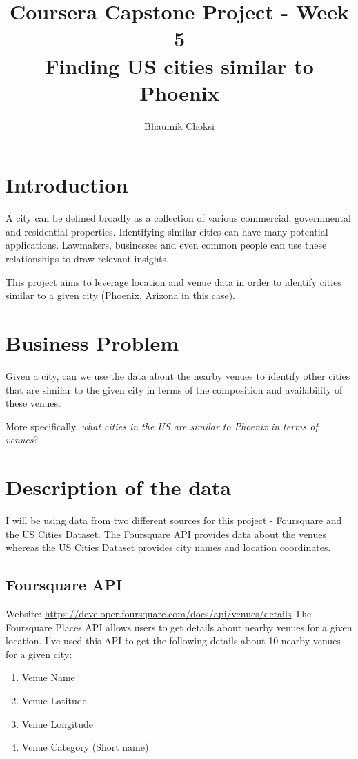 \documentclass[12pt, a4paper]{report}
\title{Coursera Capstone Project - Week 5\\ \textbf{Finding US cities similar to Phoenix} }
\author{Bhaumik Choksi}
\begin{document}
	\maketitle
		
	\section*{Introduction}
	A city can be defined broadly as a collection of various commercial, governmental and residential properties. Identifying similar cities can have many potential applications. Lawmakers, businesses and even common people can use these relationships to draw relevant insights. 
	
	This project aims to leverage location and venue data in order to identify cities similar to a given city (Phoenix, Arizona in this case). 
	
	
	\section*{Business Problem}
	Given a city, can we use the data about the nearby venues to identify other cities that are similar to the given city in terms of the composition and availability of these venues.
	
	More specifically, \textit{what cities in the US are similar to Phoenix in terms of venues}? 



\section*{Description of the data}
I will be using data from two different sources for this project - Foursquare and the US Cities Dataset. The Foursquare API provides data about the venues whereas the US Cities Dataset provides city names and location coordinates. 

\subsection*{Foursquare API}
Website: \href{https://developer.foursquare.com/docs/api/venues/details}{https://developer.foursquare.com/docs/api/venues/details}
\newline
The Foursquare Places API allows users to get details about nearby venues for a given location. I've used this API to get the following details about 10 nearby venues for a given city:
\begin{enumerate}
	\item Venue Name
	\item Venue Latitude
	\item Venue Longitude
	\item Venue Category (Short name)
\end{enumerate}
\end{document}
